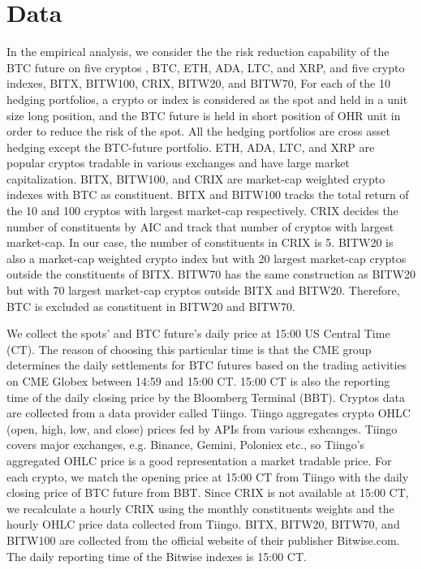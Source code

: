 \section{Data}\label{subsec:data}
In the empirical analysis, we consider the the risk reduction capability of the BTC future on five cryptos
, BTC, ETH, ADA, LTC, and XRP, and five crypto indexes, BITX, BITW100, CRIX, BITW20, and BITW70,
For each of the 10 hedging portfolios, a crypto or index is considered as the spot and held in a unit size long position,
and the BTC future is held in short position of OHR unit in order to reduce the risk of the spot.
All the hedging portfolios are cross asset hedging except the BTC-future portfolio.
ETH, ADA, LTC, and XRP are popular cryptos tradable in various exchanges and have large market capitalization.
BITX, BITW100, and CRIX are market-cap weighted crypto indexes with BTC as constituent.
BITX and BITW100 tracks the total return of the 10 and 100 cryptos with largest market-cap respectively.
CRIX decides the number of constituents by AIC and track that number of cryptos with largest market-cap.
In our case, the number of constituents in CRIX is 5.
BITW20 is also a market-cap weighted crypto index but with 20 largest market-cap cryptos outside the constituents of
BITX.
BITW70 has the same construction as BITW20 but with 70 largest market-cap cryptos outside BITX and BITW20.
Therefore, BTC is excluded as constituent in BITW20 and BITW70. \medskip

We collect the spots' and BTC future's daily price at 15:00 US Central Time (CT).
The reason of choosing this particular time is that the CME group determines the daily settlements for BTC futures based on the trading activities on CME Globex between 14:59 and 15:00 CT.
15:00 CT is also the reporting time of the daily closing price by the Bloomberg Terminal (BBT).
Cryptos data are collected from a data provider called Tiingo.
Tiingo aggregates crypto OHLC (open, high, low, and close) prices fed by APIs from various exhcanges.
Tiingo covers major exchanges, e.g. Binance, Gemini, Poloniex etc., so Tiingo's aggregated OHLC price is a good representation a market tradable price.
For each crypto, we match the opening price at 15:00 CT from Tiingo with the daily closing price of BTC future from BBT.
Since CRIX is not available at 15:00 CT, we recalculate a hourly CRIX using the monthly constituents weights and the hourly OHLC price data collected from Tiingo.
BITX, BITW20, BITW70, and BITW100 are collected from the official website of their publisher Bitwise.com.
The daily reporting time of the Bitwise indexes is 15:00 CT.


















